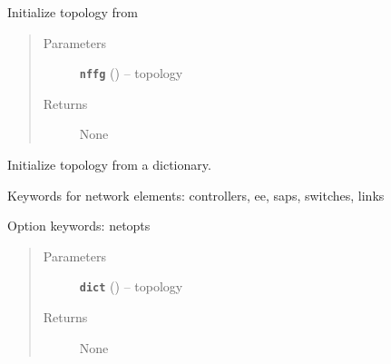 \documentclass[letterpaper,10pt,english]{sphinxmanual}
\begin{document}
\begin{fulllineitems}
\begin{fulllineitems}
\begin{quote}
\begin{description}
\end{description}\end{quote}

\end{fulllineitems}


\begin{fulllineitems}
\label{infr/topology:escape.infr.topology.ESCAPENetworkBuilder._ESCAPENetworkBuilder__init_from_NFFG}
Initialize topology from {\hyperref[util/nffg:escape.util.nffg.NFFG]{\emph{}}}
\begin{quote}\begin{description}
\item[{Parameters}] \leavevmode
\textbf{\texttt{nffg}} ({\hyperref[util/nffg:escape.util.nffg.NFFG]{\emph{}}}) -- topology

\item[{Returns}] \leavevmode
None

\end{description}\end{quote}

\end{fulllineitems}


\begin{fulllineitems}
\label{infr/topology:escape.infr.topology.ESCAPENetworkBuilder._ESCAPENetworkBuilder__init_from_dict}
Initialize topology from a dictionary.

Keywords for network elements: controllers, ee, saps, switches, links

Option keywords: netopts
\begin{quote}\begin{description}
\item[{Parameters}] \leavevmode
\textbf{\texttt{dict}} ({\hyperref[util/nffg:escape.util.nffg.NFFG]{\emph{}}}) -- topology

\item[{Returns}] \leavevmode
None

\end{description}\end{quote}


\end{fulllineitems}
\end{fulllineitems}
\end{document}
